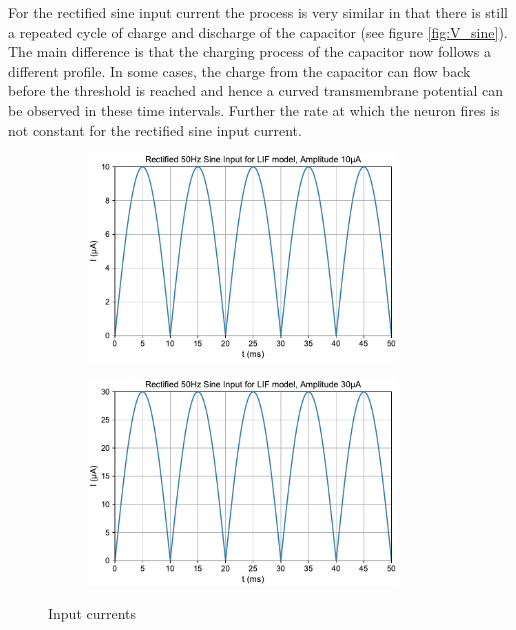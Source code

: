 \documentclass{scrartcl}
\begin{document}
For the rectified sine input current the process is very similar in that there is still a repeated cycle of charge and discharge of the capacitor (see figure \ref{fig:V_sine}). The main difference is that the charging process of the capacitor now follows a different profile. In some cases, the charge from the capacitor can flow back before the threshold is reached and hence a curved transmembrane potential can be observed in these time intervals. Further the rate at which the neuron fires is not constant for the rectified sine input current. 

\begin{figure}[p]
	\centering
	\begin{subfigure}{\textwidth}
	\includegraphics[width=0.9\textwidth]{figures/sine_10.pdf}
	\vspace{0.8cm}
	\end{subfigure}
	\begin{subfigure}{\textwidth}
	\includegraphics[width=0.9\textwidth]{figures/sine_30.pdf}
	\end{subfigure}
	\vspace{0.8cm}
	\caption{Input currents}
	\label{fig:sine}
\end{figure}
\end{document}
